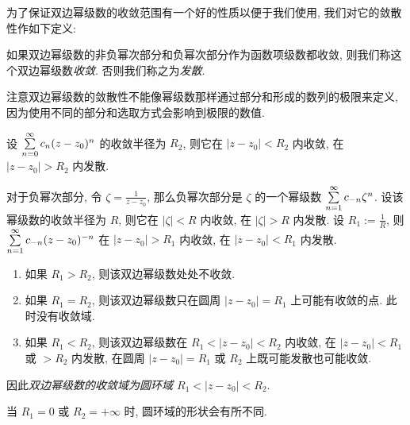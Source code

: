 为了保证双边幂级数的收敛范围有一个好的性质以便于我们使用, 我们对它的敛散性作如下定义:
\begin{definition}
	如果双边幂级数的非负幂次部分和负幂次部分作为函数项级数都收敛, 则我们称这个双边幂级数\emph{收敛}. 否则我们称之为\emph{发散}.
\end{definition}

注意双边幂级数的敛散性不能像幂级数那样通过部分和形成的数列的极限来定义,
因为使用不同的部分和选取方式会影响到极限的数值.

设 $\sum\limits_{n=0}^\infty c_n(z-z_0)^n$ 的收敛半径为 $R_2$, 则它在 $|z-z_0|<R_2$ 内收敛, 在 $|z-z_0|>R_2$ 内发散.

对于负幂次部分, 令 $\zeta=\frac1{z-z_0}$, 那么负幂次部分是 $\zeta$ 的一个幂级数 $\sum\limits_{n=1}^\infty c_{-n}\zeta^n$.
设该幂级数的收敛半径为 $R$, 则它在 $|\zeta|<R$ 内收敛, 在 $|\zeta|>R$ 内发散.
设 $R_1:=\frac1R$, 则 $\sum\limits_{n=1}^\infty c_{-n}(z-z_0)^{-n}$ 在 $|z-z_0|>R_1$ 内收敛, 在 $|z-z_0|<R_1$ 内发散.

\begin{enumerate}
	\item 如果 $R_1>R_2$, 则该双边幂级数处处不收敛.
	\item 如果 $R_1=R_2$, 则该双边幂级数只在圆周 $|z-z_0|=R_1$ 上可能有收敛的点.
		此时没有收敛域.
	\item 如果 $R_1<R_2$, 则该双边幂级数在 $R_1<|z-z_0|<R_2$ 内收敛, 在 $|z-z_0|<R_1$ 或 $>R_2$ 内发散, 在圆周 $|z-z_0|=R_1$ 或 $R_2$ 上既可能发散也可能收敛.
\end{enumerate}

因此\emph{双边幂级数的收敛域为圆环域 $R_1<|z-z_0|<R_2$}.

当 $R_1=0$ 或 $R_2=+\infty$ 时, 圆环域的形状会有所不同.
\begin{center}
\end{center}

